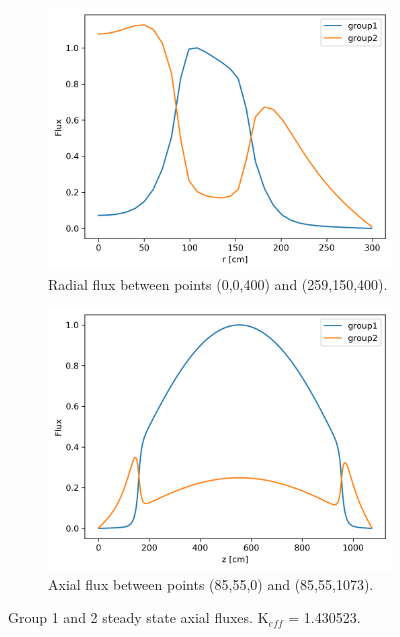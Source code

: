 \documentclass[11pt,letterpaper]{article}
\begin{document}
	\begin{figure}[htbp!]
		\centering
		\begin{subfigure}[t]{0.4\textwidth}
			\centering
			\includegraphics[width=\linewidth]{3D-fullcore-60-radial1}
			\caption{Radial flux between points (0,0,400) and (259,150,400).}
		\end{subfigure}
		\begin{subfigure}[t]{0.4\textwidth}
			\centering
			\includegraphics[width=\linewidth]{3D-fullcore-60-axial1}
			\caption{Axial flux between points (85,55,0) and (85,55,1073).}
		\end{subfigure}
		\hfill
		\caption{Group 1 and 2 steady state axial fluxes. K$_{eff}$ = 1.430523.}
		\label{fig:3D-fullcore-60-homo1}
	\end{figure}

\pagebreak

% 
\end{document}
